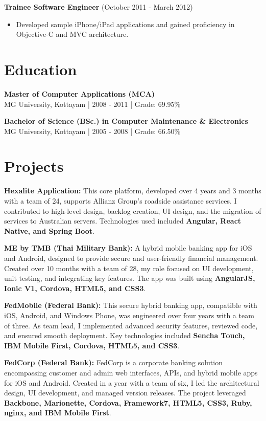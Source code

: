 \documentclass[10pt, letterpaper]{article}
\newenvironment{highlights}{
    \begin{itemize}[
        topsep=0.10cm,
        parsep=0.10cm,
        partopsep=0pt,
        itemsep=0pt,
        leftmargin=0.4cm + 10pt
    ]
}{
    \end{itemize}
}
\begin{document}
\noindent \textbf{Trainee Software Engineer} (October 2011 - March 2012)
\begin{highlights}
    \item Developed sample iPhone/iPad applications and gained proficiency in Objective-C and MVC architecture.
\end{highlights}


\section*{Education}
\noindent \textbf{Master of Computer Applications (MCA)} \\
MG University, Kottayam | 2008 - 2011 | Grade: 69.95\%

\noindent \textbf{Bachelor of Science (BSc.) in Computer Maintenance \& Electronics} \\
MG University, Kottayam | 2005 - 2008 | Grade: 66.50\%

\section*{Projects}

\noindent \textbf{Hexalite Application:} 
This core platform, developed over 4 years and 3 months with a team of 24, supports Allianz Group's roadside assistance services. I contributed to high-level design, backlog creation, UI design, and the migration of services to Australian servers. Technologies used included \textbf{Angular, React Native, and Spring Boot}.

\noindent \textbf{ME by TMB (Thai Military Bank):} 
A hybrid mobile banking app for iOS and Android, designed to provide secure and user-friendly financial management. Created over 10 months with a team of 28, my role focused on UI development, unit testing, and integrating key features. The app was built using \textbf{AngularJS, Ionic V1, Cordova, HTML5, and CSS3}.

\noindent \textbf{FedMobile (Federal Bank):} 
This secure hybrid banking app, compatible with iOS, Android, and Windows Phone, was engineered over four years with a team of three. As team lead, I implemented advanced security features, reviewed code, and ensured smooth deployment. Key technologies included \textbf{Sencha Touch, IBM Mobile First, Cordova, HTML5, and CSS3}.

\noindent \textbf{FedCorp (Federal Bank):} 
FedCorp is a corporate banking solution encompassing customer and admin web interfaces, APIs, and hybrid mobile apps for iOS and Android. Created in a year with a team of six, I led the architectural design, UI development, and managed version releases. The project leveraged \textbf{Backbone, Marionette, Cordova, Framework7, HTML5, CSS3, Ruby, nginx, and IBM Mobile First}.
\end{document}
